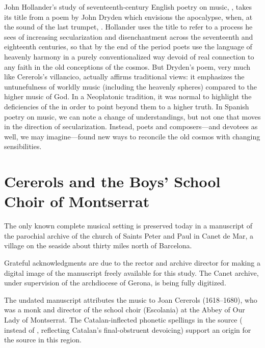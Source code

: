 John Hollander's study of seventeenth-century English poetry on music,
, takes its title from a poem by John Dryden
which envisions the apocalypse, when, at the sound of the last trumpet,
.%
    \Autocites
    {Hollander:Untuning}
    {Dryden:Alexander}
Hollander uses the title to refer to a process he sees of increasing
secularization and disenchantment across the seventeenth and eighteenth
centuries, so that by the end of the period poets use the language of heavenly
harmony in a purely conventionalized way devoid of real connection to any faith
in the old conceptions of the cosmos.
But Dryden's poem, very much like Cererols's villancico, actually affirms
traditional views: it emphasizes the untunefulness of worldly music (including
the heavenly spheres) compared to the higher music of God.
In a Neoplatonic tradition, it was normal to highlight the deficiencies of the
 in order to point beyond them to a higher
truth.
In Spanish poetry on music, we can note a change of understandings, but not one
that moves in the direction of secularization.%
    \Autocite{UribeBracho:OrfeoPhD}
Instead, poets and composers---and devotees as well, we may imagine---found new
ways to reconcile the old cosmos with changing sensibilities.

\section{Cererols and the Boys' School Choir of Montserrat}

The only known complete musical setting is preserved today in a manuscript of
the parochial archive of the church of Saints Peter and Paul in Canet de Mar, a
village on the seaside about thirty miles north of Barcelona.%
\begin{Footnote}
    Grateful acknowledgments are due to the rector and archive director for
    making a digital image of the manuscript freely available for this study.
    The Canet archive, under supervision of the archdiocese of Gerona, is being
    fully digitized.
\end{Footnote}
The undated manuscript attributes the music to Joan Cererols (1618--1680), who
was a monk and director of the school choir (Escolania) at the Abbey of Our Lady
of Montserrat.%
    \Autocite{Bonastre:CanetCatalog}
The Catalan-inflected phonetic spellings in the source ( instead
of , reflecting Catalan's final-obstruent devoicing) support an
origin for the source in this region.%
    \Autocite{Myers:CatalanPhonology}

